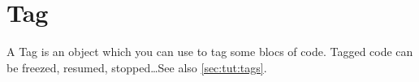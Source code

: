 \section{Tag}

A Tag is an object which you can use to tag some blocs of code.
Tagged code can be freezed, resumed, stopped\ldots See also \autoref{sec:tut:tags}.

